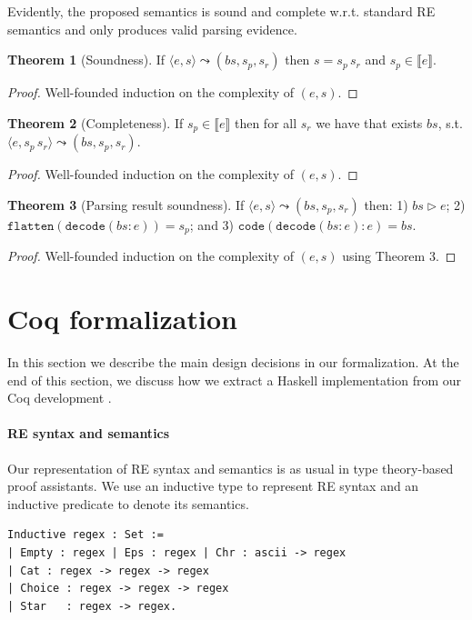 \documentclass[review]{elsarticle}
\newcommand{\sembrackets}[1]{\ensuremath{\llbracket #1 \rrbracket}}
\newcommand{\flatten}{\ensuremath{\texttt{flatten}}}
\newcommand{\code}{\ensuremath{\texttt{code}}}
\newcommand{\decodee}{\ensuremath{\texttt{decode}}}
\theoremstyle{definition}
\newtheorem{Theorem}{Theorem}
\begin{document}
Evidently, the proposed semantics is sound and complete w.r.t. standard RE
semantics and only produces valid parsing evidence.

\begin{Theorem}[Soundness]
  If $\langle e, s \rangle \leadsto (bs,s_p,s_r)$ then $s = s_p\,s_r$ and $s_p\in\sembrackets{e}$.
\end{Theorem}
\begin{proof}
  Well-founded induction on the complexity of $(e,s)$.
\end{proof}

\begin{Theorem}[Completeness]
  If $s_p\in\sembrackets{e}$ then for all $s_r$ we have that exists $bs$, s.t. $\langle e, s_p\,s_r \rangle \leadsto (bs,s_p,s_r)$.
\end{Theorem}
\begin{proof}
  Well-founded induction on the complexity of $(e,s)$.
\end{proof}

\begin{Theorem}[Parsing result soundness]
  If $\langle e, s \rangle \leadsto (bs,s_p,s_r)$ then: 1) $bs \rhd e$; 2) $\flatten(\decodee(bs : e)) = s_p$; and 3)
  $\code(\decodee(bs : e) : e) = bs$. 
\end{Theorem}
\begin{proof}
  Well-founded induction on the complexity of $(e,s)$ using Theorem 3.
\end{proof}

\section{Coq formalization}\label{section:formalization}

In this section we describe the main design decisions in our formalization. At
the end of this section, we discuss how we extract a Haskell implementation from
our Coq development
.

\paragraph{RE syntax and semantics} Our representation of RE syntax and
semantics is as usual in type theory-based proof assistants. We use an inductive
type to represent RE syntax and an inductive predicate to denote its semantics.

\begin{verbatim}
Inductive regex : Set :=
| Empty : regex | Eps : regex | Chr : ascii -> regex
| Cat : regex -> regex -> regex
| Choice : regex -> regex -> regex
| Star   : regex -> regex.
\end{verbatim}
\end{document}

